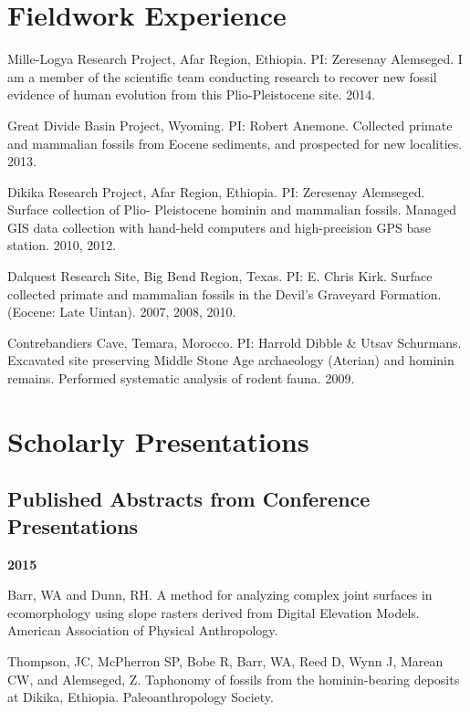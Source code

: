 \documentclass{article}
\begin{document}
\section*{Fieldwork Experience}
\begin{description*}
\item[] Mille-Logya Research Project, Afar Region, Ethiopia. PI: Zeresenay Alemseged. I am a member of the scientific team conducting research to recover new fossil evidence of human evolution from this Plio-Pleistocene site. 2014.

\item[] Great Divide Basin Project, Wyoming. PI: Robert Anemone. Collected primate and mammalian fossils from Eocene sediments, and prospected for new localities. 2013.

\item[] Dikika Research Project, Afar Region, Ethiopia. PI: Zeresenay Alemseged. Surface collection of Plio- Pleistocene hominin and mammalian fossils. Managed GIS data collection with hand-held computers and high-precision GPS base station. 2010, 2012.

\item[] Dalquest Research Site, Big Bend Region, Texas. PI: E. Chris Kirk. Surface collected primate and mammalian fossils in the Devil's Graveyard Formation. (Eocene: Late Uintan). 2007, 2008, 2010.

\item[] Contrebandiers Cave, Temara, Morocco. PI: Harrold Dibble \& Utsav Schurmans. Excavated site preserving Middle Stone Age archaeology (Aterian) and hominin remains. Performed systematic analysis of rodent fauna. 2009.
\end{description*}
\section*{Scholarly Presentations}

\subsection*{Published Abstracts from Conference Presentations}

\begin{description*}
\item[] {\bfseries 2015}
\item[] Barr, WA and Dunn, RH. A method for analyzing complex joint surfaces in ecomorphology using slope rasters derived from Digital Elevation Models. American Association of Physical Anthropology.
\item[] Thompson, JC, McPherron SP, Bobe R, Barr, WA, Reed D, Wynn J, Marean CW, and Alemseged, Z. Taphonomy of fossils from the hominin-bearing deposits at Dikika, Ethiopia. Paleoanthropology Society.
\end{description*}
\end{document}
